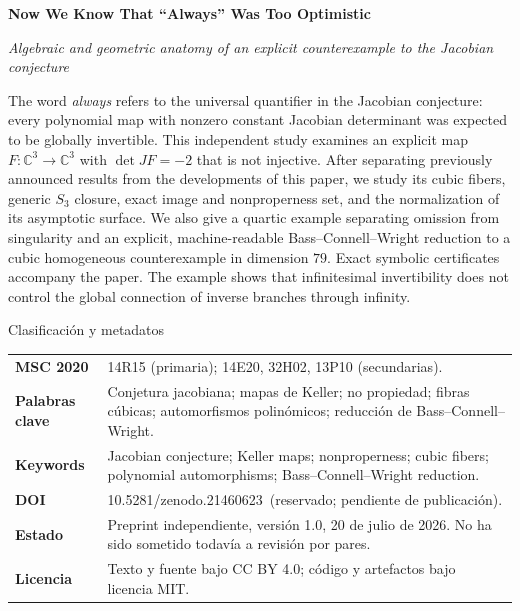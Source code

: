 \documentclass[11pt]{article}
\newcommand{\paperdoi}{10.5281/zenodo.21460623}
\theoremstyle{definition}
\theoremstyle{remark}
\newcommand{\C}{\mathbb{C}}
\begin{document}
\begin{center}
{\sffamily\bfseries\large Now We Know That ``Always'' Was Too Optimistic}\par
\smallskip
{\sffamily\itshape Algebraic and geometric anatomy of an explicit
counterexample to the Jacobian conjecture}
\end{center}

The word \emph{always} refers to the universal quantifier in the Jacobian
conjecture: every polynomial map with nonzero constant Jacobian determinant
was expected to be globally invertible. This independent study examines an
explicit map $F\colon\C^3\to\C^3$ with $\det JF=-2$ that is not injective.
After separating previously announced results from the developments of this
paper, we study its cubic fibers, generic $S_3$ closure, exact image and
nonproperness set, and the normalization of its asymptotic surface. We also
give a quartic example separating omission from singularity and an explicit,
machine-readable Bass--Connell--Wright reduction to a cubic homogeneous
counterexample in dimension $79$. Exact symbolic certificates accompany the
paper. The example shows that infinitesimal invertibility does not control the
global connection of inverse branches through infinity.

\begin{insightbox}{Clasificaci\'on y metadatos}
\begin{tabularx}{\textwidth}{@{}>{\sffamily\bfseries\color{deepblue}}p{}X@{}}
MSC 2020 & 14R15 (primaria); 14E20, 32H02, 13P10 (secundarias).\\
Palabras clave & Conjetura jacobiana; mapas de Keller; no propiedad; fibras
c\'ubicas; automorfismos polin\'omicos; reducci\'on de
Bass--Connell--Wright.\\
Keywords & Jacobian conjecture; Keller maps; nonproperness; cubic fibers;
polynomial automorphisms; Bass--Connell--Wright reduction.\\
DOI & \paperdoi\ (reservado; pendiente de publicaci\'on).\\
Estado & Preprint independiente, versi\'on 1.0, 20 de julio de 2026. No ha
sido sometido todav\'ia a revisi\'on por pares.\\
Licencia & Texto y fuente bajo CC BY 4.0; c\'odigo y artefactos bajo licencia
MIT.\\
\end{tabularx}
\end{insightbox}
\end{document}
